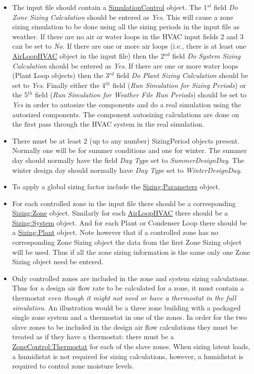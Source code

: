 \begin{itemize}
\item
  The input file should contain a \hyperref[simulationcontrol]{SimulationControl} object. The 1\(^{st}\) field \emph{Do Zone Sizing Calculation} should be entered as \emph{Yes}. This will cause a zone sizing simulation to be done using all the sizing periods in the input file as weather. If there are no air or water loops in the HVAC input fields 2 and 3 can be set to \emph{No.} If there are one or more air loops (i.e., there is at least one \hyperref[airloophvac]{AirLoopHVAC} object in the input file) then the 2\(^{nd}\) field \emph{Do System Sizing Calculation} should be entered as \emph{Yes}. If there are one or more water loops (Plant Loop objects) then the 3\(^{rd}\) field \emph{Do Plant Sizing Calculation} should be set to \emph{Yes}. Finally either the 4\(^{th}\) field (\emph{Run Simulation for Sizing Periods}) or the 5\(^{th}\) field (\emph{Run Simulation for Weather File Run Periods}) should be set to \emph{Yes} in order to autosize the components and do a real simulation using the autosized components. The component autosizing calculations are done on the first pass through the HVAC system in the real simulation.
\item
  There must be at least 2 (up to any number) SizingPeriod objects present. Normally one will be for summer conditions and one for winter. The summer day should normally have the field \emph{Day Type} set to \emph{SummerDesignDay}. The winter design day should normally have \emph{Day Type} set to \emph{WinterDesignDay}.
\item
  To apply a global sizing factor include the \hyperref[sizingparameters]{Sizing:Parameters} object.
\item
  For each controlled zone in the input file there should be a corresponding \hyperref[sizingzone]{Sizing:Zone} object. Similarly for each \hyperref[airloophvac]{AirLoopHVAC} there should be a \hyperref[sizingsystem]{Sizing:System} object. And for each Plant or Condenser Loop there should be a \hyperref[sizingplant]{Sizing:Plant} object. Note however that if a controlled zone has no corresponding Zone Sizing object the data from the first Zone Sizing object will be used. Thus if all the zone sizing information is the same only one Zone Sizing object need be entered.
\item
  Only controlled zones are included in the zone and system sizing calculations. Thus for a design air flow rate to be calculated for a zone, it must contain a thermostat \emph{even though it might not need or have a thermostat in the full simulation}. An illustration would be a three zone building with a packaged single zone system and a thermostat in one of the zones. In order for the two slave zones to be included in the design air flow calculations they must be treated as if they have a thermostat: there must be a \hyperref[zonecontrolthermostat]{ZoneControl:Thermostat} for each of the slave zones. When sizing latent loads, a humidistat is not required for sizing calculations, however, a humidistat is required to control zone moisture levels.

\end{itemize}
